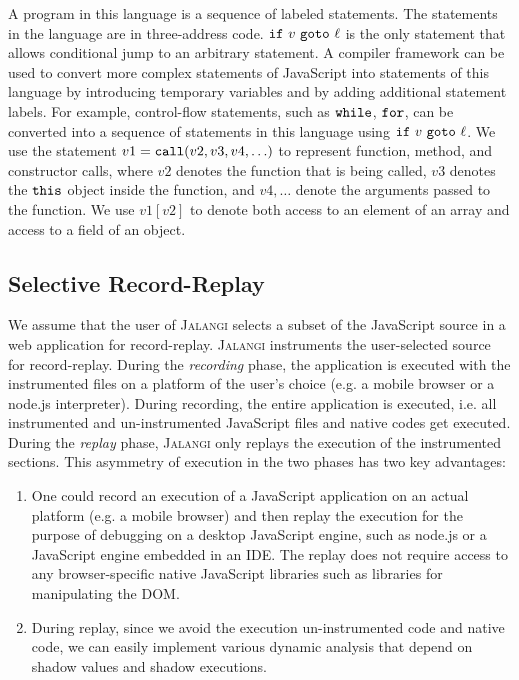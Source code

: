 \documentclass{sig-alternate}
\def\jalangi{\textsc{Jalangi}}
\newcommand \dsl [1] {\ensuremath{{\tt #1}}\xspace}
\begin{document}
A program in this language is a sequence of labeled statements.  The
statements in the language are in three-address code.  $\dsl{if}\ v\
\dsl{goto}\ \ell$ is the only statement that allows conditional jump
to an arbitrary statement.  A compiler framework can be used to
convert more complex statements of JavaScript into statements of this
language by introducing temporary variables and by adding additional
statement labels.  For example, control-flow statements, such as
\dsl{while}, \dsl{for}, can be converted into a sequence of statements
in this language using $\dsl{if}\ v\ \dsl{goto}\ \ell$.  We use the
statement $v1 = \dsl{call}(v2, v3, v4, \ldots)$ to represent function,
method, and constructor calls, where $v2$ denotes the function that is
being called, $v3$ denotes the \dsl{this} object inside the function,
and $v4, \ldots$ denote the arguments passed to the function.  We use
$v1[v2]$ to denote both access to an element of an array and access to
a field of an object.

\subsection{Selective Record-Replay}
\label{sec:unopt-select-record}

We assume that the user of \jalangi{} selects a subset of the
JavaScript source in a web application for record-replay.  \jalangi{}
instruments the user-selected source for record-replay.  During the
\emph{recording} phase, the application is executed with the
instrumented files on a platform of the user's choice (e.g. a mobile
browser or a node.js interpreter).  During recording, the entire
application is executed, i.e. all instrumented and un-instrumented
JavaScript files and native codes get executed.  During the
\emph{replay} phase, \jalangi{} only replays the execution of the
instrumented sections.  This asymmetry of execution in the two phases has
two key advantages:
\begin{enumerate}
\item One could record an execution of a JavaScript application on an
  actual platform (e.g. a mobile browser) and then replay the
  execution for the purpose of debugging on a desktop JavaScript
  engine, such as node.js or a JavaScript engine embedded in an IDE.
  The replay does not require access to any browser-specific native
  JavaScript libraries such as libraries for manipulating the DOM.
\item During replay, since we avoid the execution un-instrumented code
  and native code, we can easily implement various dynamic analysis
  that depend on shadow values and shadow executions. 
\end{enumerate}
\end{document}
